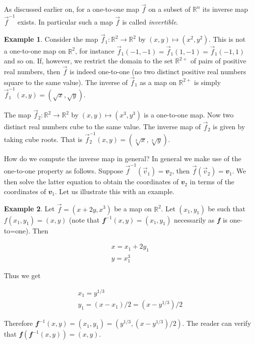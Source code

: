 \documentclass[
  a4paper,
  oneside,
  final]{krantz}
\newcommand{\R}{\mathbb{R}}
\renewcommand{\v}[1]{{\mathbfit{#1}}}
\theoremstyle{definition}
\theoremstyle{definition}
\newtheorem{example}{Example}[chapter]
\theoremstyle{definition}
\theoremstyle{definition}
\theoremstyle{remark}
\begin{document}
As discussed earlier on, for a one-to-one map \(\vec{f}\) on a subset of \(\R^{n}\) its inverse map \(\vec{f}^{-1}\) exists. In particular such a map \(\vec{f}\) is called \emph{invertible}.

\begin{example}

Consider the map \(\vec{f}_{1}: \R^2 \to \R^2\) by \((x,y) \mapsto (x^2, y^2)\). This is not a one-to-one map on \(\R^2\), for instance \(\vec{f}_1(-1, -1) = \vec{f}_1(1, -1) = \vec{f}_1(-1,1)\) and so on. If, however, we restrict the domain to the set \(\R^{2+}\) of pairs of positive real numbers, then \(\vec{f}\) is indeed one-to-one (no two distinct positive real numbers square to the same value). The inverse of \(\vec{f}_{1}\) as a map on \(\R^{2+}\) is simply \(\vec{f}_1^{-1}(x,y) = (\sqrt{x}, \sqrt{y})\).

The map \(\vec{f}_{2}: \R^2 \to \R^2\) by \((x,y) \mapsto (x^3, y^3)\) is a one-to-one map. Now two distinct real numbers cube to the same value. The inverse map of \(\vec{f}_{2}\) is given by taking cube roots. That is \(\vec{f}_2^{-1}(x,y) = (\sqrt[3]{x}, \sqrt[3]{y})\).
\end{example}

How do we compute the inverse map in general? In general we make use of the one-to-one property as follows. Suppose \(\vec{f}^{-1}(\vec{v}_1) = \v{v}_2\), then \(\vec{f}(\vec{v}_2) = \v{v}_1\). We then solve the latter equation to obtain the coordinates of \(\v{v}_2\) in terms of the coordinates of \(\v{v}_{1}\). Let us illustrate this with an example.

\begin{example}

Let \(\vec{f}= (x+2y, x^3)\) be a map on \(\R^2\). Let \((x_1, y_1)\) be such that \(f(x_1, y_1) = (x, y)\) (note that \(\v{f}^{-1}(x,y) = (x_1, y_1)\) necessarily as \(\v{f}\) is one-to=one). Then

\begin{align*}
 &x = x_1 + 2y_1\\
 &y = x_1^3
\end{align*}

Thus we get

\begin{align*}
 &x_1 = y^{1/3}\\
 &y_1 = (x - x_1)/2 = (x -y^{1/3})/2
\end{align*}

Therefore \(\v{f}^{-1}(x,y) = (x_1,y_1) = (y^{1/3}, (x- y^{1/3})/2)\). The reader can verify that \(\v{f}(\v{f}^{-1}(x,y)) = (x,y)\).
\end{example}
\end{document}
